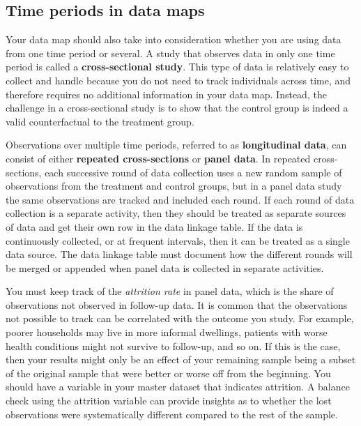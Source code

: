\subsection{Time periods in data maps}

Your data map should also take into consideration
whether you are using data from one time period or several.
A study that observes data in only one time period is called
a \textbf{cross-sectional study}.
This type of data is relatively easy to collect and handle because
you do not need to track individuals across time,
and therefore requires no additional information in your data map.
Instead, the challenge in a cross-sectional study is to
show that the control group is indeed a valid counterfactual to the treatment group.

Observations over multiple time periods,
referred to as \textbf{longitudinal data},
can consist of either
\textbf{repeated cross-sections}
or \textbf{panel data}.
In repeated cross-sections,
each successive round of data collection uses a new random sample
of observations from the treatment and control groups,
but in a panel data study
the same observations are tracked and included each round.
If each round of data collection is a separate activity,
then they should be treated as separate sources of data
and get their own row in the data linkage table.
If the data is continuously collected,
or at frequent intervals,
then it can be treated as a single data source.
The data linkage table must document
how the different rounds will be merged or appended
when panel data is collected in separate activities.

You must keep track of the \textit{attrition rate} in panel data,
which is the share of observations not observed in follow-up data.
It is common that the observations not possible to track
can be correlated with the outcome you study.
For example, poorer households may live in more informal dwellings,
patients with worse health conditions might not survive to follow-up,
and so on.
If this is the case,
then your results might only be an effect of your remaining sample
being a subset of the original sample
that were better or worse off from the beginning.
You should have a variable in your master dataset
 that indicates attrition.
A balance check using the attrition variable
can provide insights as to whether the lost observations
were systematically different
compared to the rest of the sample.

